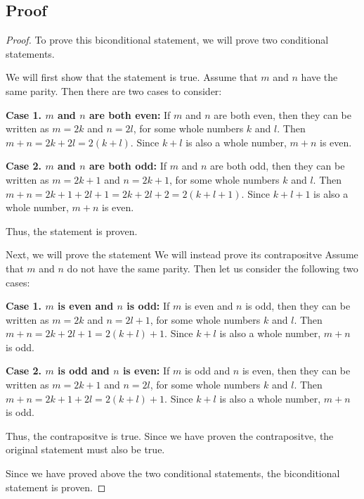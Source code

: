 \documentclass{article}
\begin{document}
    \subsection*{Proof}
    \begin{proof}
        To prove this biconditional statement, we will prove two conditional statements.

        \noindent We will first show that the statement  is true. Assume that $ m $ and $ n $ have the same parity. 
        Then there are two cases to consider:

        \noindent \textbf{Case 1. $ m $ and $ n $ are both even:} If $ m $ and $ n $ are both even, then they can be written as $ m = 2k $ and $ n = 2l $, for some whole numbers $ k $ and $ l $.
        Then $ m + n = 2k + 2l = 2(k + l) $. Since $ k + l $ is also a whole number, $ m + n $ is even.

        \noindent \textbf{Case 2. $ m $ and $ n $ are both odd:} If $ m $ and $ n $ are both odd, then they can be written as $ m = 2k + 1 $ and $ n = 2k + 1 $, for some whole numbers $ k $ and $ l $.
        Then $ m + n = 2k + 1 + 2l + 1 = 2k + 2l + 2 = 2(k + l + 1) $. Since $ k + l + 1 $ is also a whole number, $ m + n $ is even.
        
        \noindent Thus, the statement  is proven.

        \noindent Next, we will prove the statement  We will instead prove its contrapositve  Assume that $ m $ and $ n $ do not have the same parity. Then let us consider the following two cases:

        \noindent \textbf{Case 1. $ m $ is even and $ n $ is odd:} If $ m $ is even and $ n $ is odd, then they can be written as $ m = 2k $ and $ n = 2l + 1 $, for some whole numbers $ k $ and $ l $. Then $ m + n = 2k + 2l + 1 = 2(k + l) + 1 $.
        Since $ k + l $ is also a whole number, $ m + n $ is odd.

        \noindent \textbf{Case 2. $ m $ is odd and $ n $ is even:} If $ m $ is odd and $ n $ is even, then they can be written as $ m = 2k + 1 $ and $ n = 2l $, for some whole numbers $ k $ and $ l $. Then $ m + n = 2k + 1 + 2l = 2(k + l) + 1 $.
        Since $ k + l $ is also a whole number, $ m + n $ is odd.

        \noindent Thus, the contrapositve  is true. Since we have proven the contrapositve, the original statement must also be true.

        \noindent Since we have proved above the two conditional statements, the biconditional statement  is proven.
    \end{proof}
\end{document}
